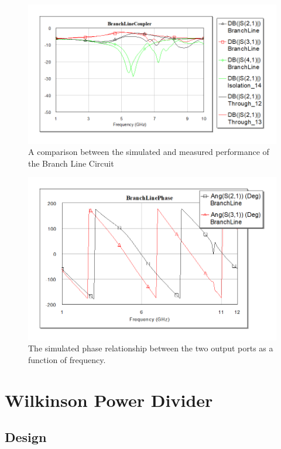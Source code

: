 \documentclass[twocolumn, aps, apl]{revtex4-1}
\begin{document}
\begin{figure}[!htbp]
    \centering
    \includegraphics[scale=0.5]{BranchCircuit.png}
    \caption{A comparison between the simulated and measured performance of the Branch Line Circuit}
    \label{fig:branchmag}
\end{figure}

\begin{figure}[!htbp]
    \centering
    \includegraphics[scale=0.5]{BranchPhase.png}
    \caption{The simulated phase relationship between the two output ports as a function of frequency.}
    \label{fig:branchphase}
\end{figure}

\FloatBarrier

\section*{Wilkinson Power Divider}

\subsection{Design}
\end{document}
